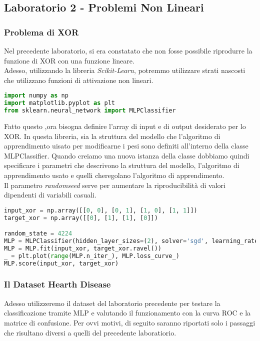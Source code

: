 \documentclass[12pt, a4paper]{article}
\begin{document}
\subsection{Laboratorio 2 - Problemi Non Lineari}
\subsubsection{Problema di XOR}
Nel precedente laboratorio, si era constatato che non fosse possibile riprodurre la funzione di XOR con una funzione lineare.\\
Adesso, utilizzando la libreria \textit{Scikit-Learn}, potremmo utilizzare strati nascosti che utilizzano funzioni di attivazione non lineari.

\begin{lstlisting}[language=Python, caption=Importazione delle Librerie Necessarie]
import numpy as np 
import matplotlib.pyplot as plt
from sklearn.neural_network import MLPClassifier   
\end{lstlisting}

Fatto questo ,ora bisogna definire l'array di input e di output desiderato per lo XOR.
In questa libreria, sia la struttura del modello che l'algoritmo di apprendimento uisato per modificarne i pesi sono definiti all'interno della classe MLPClassifier. Quando creiamo una nuova istanza della classe dobbiamo quindi specificare i parametri che descrivono la struttura del modello, l'algoritmo di apprendimento usato e quelli cheregolano l'algoritmo di apprendimento.\\
Il parametro \textit{random\textunderscore seed} serve per aumentare la riproducibilità di valori dipendenti di variabili casuali.

\begin{lstlisting}[language=Python, caption=Inizializzazione]
input_xor = np.array([[0, 0], [0, 1], [1, 0], [1, 1]])
target_xor = np.array([[0], [1], [1], [0]])    

random_state = 4224
MLP = MLPClassifier(hidden_layer_sizes=(2), solver='sgd', learning_rate_init=0.05, max_iter=10000, random_state=random_state)
MLP = MLP.fit(input_xor, target_xor.ravel())
_ = plt.plot(range(MLP.n_iter_), MLP.loss_curve_)
MLP.score(input_xor, target_xor)
\end{lstlisting}

\subsubsection{Il Dataset Hearth Disease}
Adesso utilizzeremo il dataset del laboratorio precedente per testare la classificazione tramite MLP e valutando il funzionamento con la curva ROC e la matrice di confusione.
Per ovvi motivi, di seguito saranno riportati solo i passaggi che risultano diversi a quelli del precedente laboratiorio.
\end{document}
